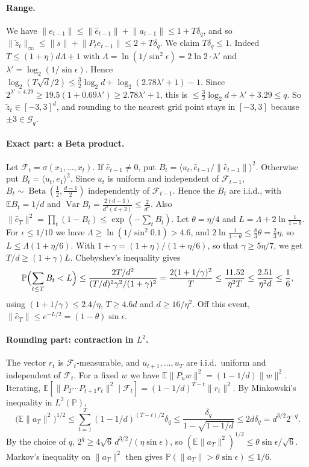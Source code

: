 \documentclass[11pt]{article}
\theoremstyle{definition}
\theoremstyle{remark}
\newcommand{\E}{\mathbb E}
\newcommand{\Prob}{\mathbb P}
\newcommand{\ip}[2]{\langle #1,#2\rangle}
\newcommand{\norm}[1]{\lVert #1\rVert}
\DeclareMathOperator{\Beta}{Beta}
\begin{document}
\paragraph{Range.} We have \(\norm{e_{t-1}}\le\norm{\hat e_{t-1}}+\norm{a_{t-1}}\le1+T\delta_q\), and so
\(\norm{\tilde z_t}_\infty\le\norm s+\norm{P_te_{t-1}}\le2+T\delta_q\). We claim \(T\delta_q\le1\). Indeed
\(T\le(1+\eta)d\Lambda+1\) with \(\Lambda=\ln(1/\sin^2\epsilon)=2\ln2\cdot\lambda'\) and \(\lambda'=\log_2(1/\sin\epsilon)\). Hence
\(\log_2(T\sqrt d/2)\le\frac32\log_2d+\log_2(2.78\lambda'+1)-1\). Since \(2^{\lambda'+4.29}\ge19.5(1+0.69\lambda')\ge2.78\lambda'+1\), this is
\(\le\frac32\log_2d+\lambda'+3.29\le q\). So \(\tilde z_t\in[-3,3]^d\), and rounding to the nearest grid point stays in
\([-3,3]\) because \(\pm3\in\mathcal G_q\).

\paragraph{Exact part: a Beta product.} Let \(\mathcal F_t=\sigma(x_1,\dots,x_t)\). If \(\hat e_{t-1}\ne0\), put
\(B_t=\ip{u_t}{\hat e_{t-1}/\norm{\hat e_{t-1}}}^2\). Otherwise put \(B_t=\ip{u_t}{e_1}^2\). Since \(u_t\) is uniform and
independent of \(\mathcal F_{t-1}\), \(B_t\sim\Beta(\frac12,\frac{d-1}2)\) independently of \(\mathcal F_{t-1}\). Hence the \(B_t\)
are i.i.d., with \(\E B_t=1/d\) and \(\operatorname{Var}B_t=\frac{2(d-1)}{d^2(d+2)}\le\frac2{d^2}\). Also
\(\norm{\hat e_T}^2=\prod_t(1-B_t)\le\exp(-\sum_tB_t)\).
Let \(\theta=\eta/4\) and \(L=\Lambda+2\ln\frac1{1-\theta}\). For \(\epsilon\le1/10\) we have \(\Lambda\ge\ln(1/\sin^2 0.1)>4.6\), and
\(2\ln\frac1{1-\theta}\le\frac{8}{3}\theta=\frac23\eta\), so \(L\le\Lambda(1+\eta/6)\). With
\(1+\gamma=(1+\eta)/(1+\eta/6)\), so that \(\gamma\ge5\eta/7\), we get \(T/d\ge(1+\gamma)L\). Chebyshev's inequality gives
\[
 \Prob\Bigl(\sum_{t\le T}B_t<L\Bigr)\le\frac{2T/d^2}{(T/d)^2\gamma^2/(1+\gamma)^2}
 =\frac{2(1+1/\gamma)^2}{T}\le\frac{11.52}{\eta^2T}\le\frac{2.51}{\eta^2d}\le\frac16 ,
\]
using \((1+1/\gamma)\le2.4/\eta\), \(T\ge4.6d\) and \(d\ge16/\eta^2\). Off this event,
\(\norm{\hat e_T}\le e^{-L/2}=(1-\theta)\sin\epsilon\).

\paragraph{Rounding part: contraction in \(L^2\).} The vector \(r_t\) is \(\mathcal F_t\)-measurable, and \(u_{t+1},\dots,u_T\) are
i.i.d.\ uniform and independent of \(\mathcal F_t\). For a fixed \(w\) we have \(\E\norm{P_uw}^2=(1-1/d)\norm w^2\). Iterating,
\(\E[\norm{P_T\cdots P_{t+1}r_t}^2\mid\mathcal F_t]=(1-1/d)^{T-t}\norm{r_t}^2\). By Minkowski's inequality in \(L^2(\Prob)\),
\[
 \bigl(\E\norm{a_T}^2\bigr)^{1/2}\le\sum_{t=1}^T(1-1/d)^{(T-t)/2}\delta_q\le\frac{\delta_q}{1-\sqrt{1-1/d}}\le2d\delta_q=d^{3/2}2^{-q}.
\]
By the choice of \(q\), \(2^q\ge4\sqrt6\,d^{3/2}/(\eta\sin\epsilon)\), so \((\E\norm{a_T}^2)^{1/2}\le\theta\sin\epsilon/\sqrt6\). Markov's inequality on
\(\norm{a_T}^2\) then gives \(\Prob(\norm{a_T}>\theta\sin\epsilon)\le1/6\).
\end{document}
